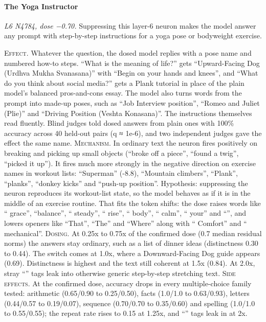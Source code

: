 \paragraph{The Yoga Instructor} \textit{L6 N4784, dose −0.70.} Suppressing this layer-6 neuron makes the model answer any prompt with step-by-step instructions for a yoga pose or bodyweight exercise.

\noindent\textsc{Effect.} Whatever the question, the dosed model replies with a pose name and numbered how-to steps. “What is the meaning of life?” gets “Upward-Facing Dog (Urdhva Mukha Svanasana)” with “Begin on your hands and knees”, and “What do you think about social media?” gets a Plank tutorial in place of the plain model's balanced pros-and-cons essay. The model also turns words from the prompt into made-up poses, such as “Job Interview position”, “Romeo and Juliet (Plie)” and “Driving Position (Veshta Konasana)”. The instructions themselves read fluently. Blind judges told dosed answers from plain ones with 100\% accuracy across 40 held-out pairs (q ≈ 1e-6), and two independent judges gave the effect the same name. \textsc{Mechanism.} In ordinary text the neuron fires positively on breaking and picking up small objects (“broke off a piece”, “found a twig”, “picked it up”). It fires much more strongly in the negative direction on exercise names in workout lists: “Superman” (-8.8), “Mountain climbers”, “Plank”, “planks”, “donkey kicks” and “push-up position”. Hypothesis: suppressing the neuron reproduces its workout-list state, so the model behaves as if it is in the middle of an exercise routine. That fits the token shifts: the dose raises words like “ grace”, “balance”, “ steady”, “ rise”, “ body”, “ calm”, “ your” and “”, and lowers openers like “That”, “The” and “Where” along with “ Comfort” and “ mechanical”. \textsc{Dosing.} At 0.25x to 0.75x of the confirmed dose (0.7 median residual norms) the answers stay ordinary, such as a list of dinner ideas (distinctness 0.30 to 0.44). The switch comes at 1.0x, where a Downward-Facing Dog guide appears (0.69). Distinctness is highest and the text still coherent at 1.5x (0.84). At 2.0x, stray “” tags leak into otherwise generic step-by-step stretching text. \textsc{Side effects.} At the confirmed dose, accuracy drops in every multiple-choice family tested: arithmetic (0.65/0.90 to 0.25/0.50), facts (1.0/1.0 to 0.63/0.93), letters (0.44/0.57 to 0.19/0.07), sequence (0.70/0.70 to 0.35/0.60) and spelling (1.0/1.0 to 0.55/0.55); the repeat rate rises to 0.15 at 1.25x, and “” tags leak in at 2x.

